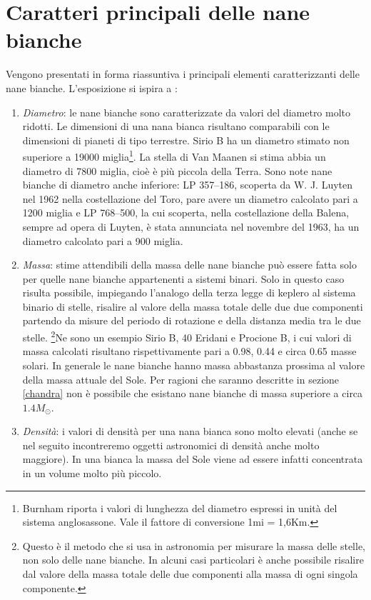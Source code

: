 \section{Caratteri principali delle nane bianche}\label{nane bianche}
Vengono presentati in forma riassuntiva i principali elementi caratterizzanti delle nane bianche. L'esposizione si ispira a \Cite{burn}:
\begin{enumerate}
\item
\emph{Diametro}:
le nane bianche sono caratterizzate da valori del diametro molto ridotti. Le dimensioni di una nana bianca risultano comparabili con le dimensioni di pianeti di tipo terrestre. Sirio B ha un diametro stimato non superiore a 19000 miglia\footnote{Burnham riporta i valori di lunghezza del diametro espressi in unit\`{a} del sistema anglosassone. Vale il fattore di conversione 1mi = 1,6Km.}. La stella di Van Maanen si stima abbia un diametro di 7800 miglia, cioè è più piccola della Terra. Sono note nane bianche di diametro anche inferiore: LP 357--186, scoperta da W. J. Luyten nel 1962 nella costellazione del Toro, pare avere un diametro calcolato pari a 1200 miglia e LP 768--500, la cui scoperta, nella costellazione della Balena, sempre ad opera di Luyten, è stata annunciata nel novembre del 1963, ha un diametro calcolato pari a 900 miglia.
\item
\emph{Massa}:
stime attendibili della massa delle nane bianche può essere fatta solo per quelle nane bianche appartenenti a sistemi binari.
Solo in questo caso risulta possibile, impiegando l'analogo della terza legge di keplero al sistema binario di stelle, risalire al valore della massa totale delle due due componenti partendo da misure del periodo di rotazione e della distanza media tra le due stelle. \footnote{Questo è il metodo che si usa in astronomia per misurare la massa delle stelle, non solo delle nane bianche. In alcuni casi particolari è anche possibile risalire dal valore della massa totale delle due componenti alla massa di ogni singola componente.}Ne sono un esempio Sirio B, 40 Eridani e Procione B, i cui valori di massa calcolati risultano rispettivamente pari a 0.98, 0.44 e circa 0.65 masse solari. In generale le nane bianche hanno massa abbastanza prossima al valore della massa attuale del Sole. Per ragioni che saranno descritte in sezione \ref{chandra} non è possibile che esistano nane bianche di massa superiore a circa $1.4 M_{\odot}$.
\item
\emph{Densit\`{a}}:
i valori di densit\`{a} per una nana bianca sono molto elevati (anche se nel seguito incontreremo oggetti astronomici di densit\`{a} anche molto maggiore). In una bianca la massa del Sole viene ad essere infatti concentrata in un volume molto più piccolo.

\end{enumerate}
